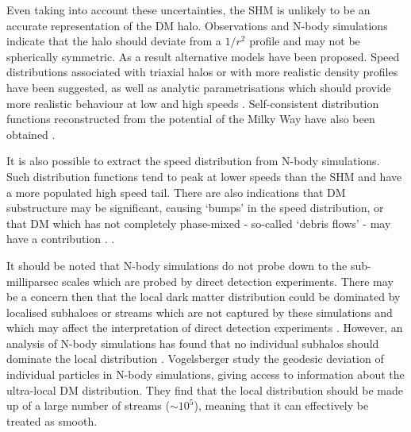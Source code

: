 Even taking into account these uncertainties, the SHM is unlikely to be an accurate representation of the DM halo. Observations and N-body simulations indicate that the halo should deviate from a $1/r^2$ profile and may not be spherically symmetric. As a result alternative models have been proposed. Speed distributions associated with triaxial halos \cite{Evans:2000} or with more realistic density profiles \cite{Widrow:2000} have been suggested, as well as analytic parametrisations which should provide more realistic behaviour at low and high speeds \cite{Lisanti:2010}. Self-consistent distribution functions reconstructed from the potential of the Milky Way have also been obtained \cite{Bhattacharjee:2012,Fornasa:2013}.

It is also possible to extract the speed distribution from N-body simulations. Such distribution functions tend \cite{Vogelsberger:2009, Kuhlen:2010, Mao:2012} to peak at lower speeds than the SHM and have a more populated high speed tail. There are also indications that DM substructure may be significant, causing `bumps' in the speed distribution, or that DM which has not completely phase-mixed - so-called `debris flows' - may have a contribution \cite{Kuhlen:2012}. .

 It should be noted that N-body simulations do not probe down to the sub-milliparsec scales which are probed by direct detection experiments. There may be a concern then that the local dark matter distribution could be dominated by localised subhaloes or streams which are not captured by these simulations and which may affect the interpretation of direct detection experiments \cite{Freese:2004}. However, an analysis of N-body simulations has found that no individual subhalos should dominate the local distribution \cite{Helmi:2002}. Vogelsberger \etal \cite{Vogelsberger:2007} study the geodesic deviation of individual particles in N-body simulations, giving access to information about the ultra-local DM distribution. They find that the local distribution should be made up of a large number of streams ($\sim 10^5$), meaning that it can effectively be treated as smooth.


